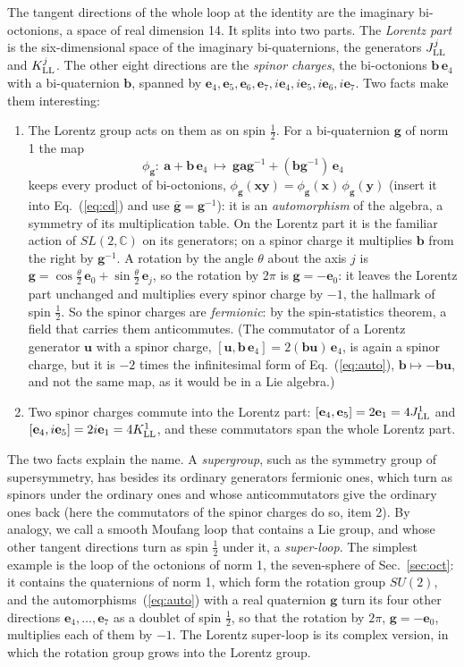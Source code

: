 \documentclass[aps,prd,twocolumn,superscriptaddress,nofootinbib,floatfix,longbibliography]{revtex4-2}
\newcommand{\LL}{{\rm LL}}
\newcommand{\e}[1]{\mathbf e_{#1}}
\begin{document}
The tangent directions of the whole loop at the identity are the imaginary bi-octonions, a space of real dimension 14.
It splits into two parts. The \emph{Lorentz part} is the six-dimensional space of the imaginary bi-quaternions, the
generators $J^j_\LL$ and $K^j_\LL$. The other eight directions are the \emph{spinor charges}, the bi-octonions
$\mathbf b\,\e4$ with a bi-quaternion $\mathbf b$, spanned by $\e4,\e5,\e6,\e7,i\e4,i\e5,i\e6,i\e7$. Two facts make
them interesting:
\begin{enumerate}
\item The Lorentz group acts on them as on spin $\frac12$. For a bi-quaternion $\mathbf g$ of norm 1 the map
\begin{equation}
\phi_{\mathbf g}:\ \mathbf a+\mathbf b\,\e4\ \mapsto\ \mathbf g\mathbf a\mathbf g^{-1}+(\mathbf b\mathbf g^{-1})\,\e4
\label{eq:auto}
\end{equation}
keeps every product of bi-octonions, $\phi_{\mathbf g}(\mathbf x\mathbf y)=\phi_{\mathbf g}(\mathbf x)\,\phi_{\mathbf
g}(\mathbf y)$ (insert it into Eq.~(\ref{eq:cd}) and use $\bar{\mathbf g}=\mathbf g^{-1}$): it is an \emph{automorphism}
of the algebra, a symmetry of its multiplication table. On the Lorentz part it is the familiar action of $SL(2,\mathbb C)$
on its generators; on a spinor charge it multiplies $\mathbf b$ from the right by $\mathbf g^{-1}$. A rotation by the angle
$\theta$ about the axis $j$ is $\mathbf g=\cos\frac\theta2\,\e0+\sin\frac\theta2\,\e j$, so the rotation by $2\pi$ is
$\mathbf g=-\e0$: it leaves the Lorentz part unchanged and multiplies every spinor charge by $-1$, the hallmark of spin
$\frac12$. So the spinor charges are \emph{fermionic}: by the spin-statistics theorem, a field that carries them
anticommutes. (The commutator of a Lorentz generator $\mathbf u$ with a spinor charge, $[\mathbf u,\mathbf
b\,\e4]=2(\mathbf b\mathbf u)\,\e4$, is again a spinor charge, but it is $-2$ times the infinitesimal form of
Eq.~(\ref{eq:auto}), $\mathbf b\mapsto-\mathbf b\mathbf u$, and not the same map, as it would be in a Lie algebra.)
\item Two spinor charges commute into the Lorentz part: $[\e4,\e5]=2\e{1}=4J^1_\LL$ and $[\e4,i\e5]=2i\e{1}=4K^1_\LL$,
and these commutators span the whole Lorentz part.
\end{enumerate}
The two facts explain the name. A \emph{supergroup}, such as the symmetry group of supersymmetry, has besides its
ordinary generators fermionic ones, which turn as spinors under the ordinary ones and whose anticommutators give the
ordinary ones back (here the commutators of the spinor charges do so, item 2). By analogy, we call a smooth Moufang loop that contains a Lie group, and whose other tangent
directions turn as spin $\frac12$ under it, a \emph{super-loop}. The simplest example is the loop of the octonions of norm
1, the seven-sphere of Sec.~\ref{sec:oct}: it contains the quaternions of norm 1, which form the rotation group $SU(2)$,
and the automorphisms~(\ref{eq:auto}) with a real quaternion $\mathbf g$ turn its four other directions $\e4,\dots,\e7$
as a doublet of spin $\frac12$, so that the rotation by $2\pi$, $\mathbf g=-\e0$, multiplies each of them by $-1$. The
Lorentz super-loop is its complex version, in which the rotation group grows into the Lorentz group.
\end{document}
